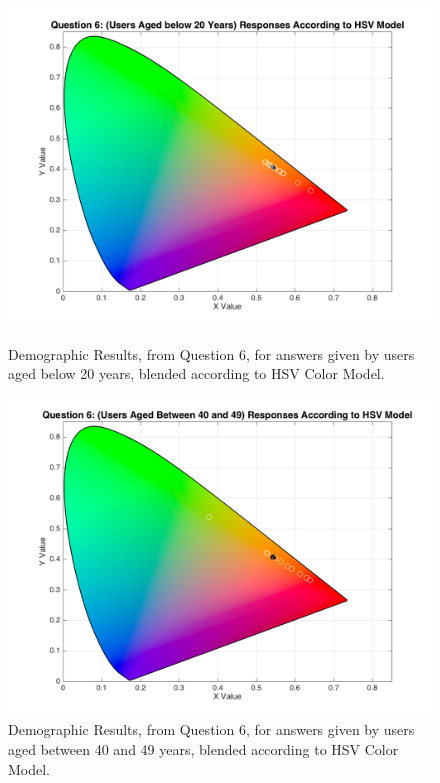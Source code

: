 \begin{figure}[!htbp]
  \centering
  \begin{minipage}{0.48\textwidth}
    \centering
    \includegraphics[width=\textwidth]{images/results/6_demo_age20_HSVresponses.png}
    \caption[Demographic Results, from Question 6, for answers given by users aged below 20 years, blended according to HSV Color Model.]{Demographic Results, from Question 6, for answers given by users aged below 20 years, blended according to HSV Color Model.}
    \label{fig:age_1}
  \end{minipage}\hfill
  \begin{minipage}{0.48\textwidth}
    \centering
    \includegraphics[width=\textwidth]{images/results/6_demo_age40_49_HSVresponses.png}
    \caption[Demographic Results, from Question 6, for answers given by users aged between 40 and 49 years, blended according to HSV Color Model.]{Demographic Results, from Question 6, for answers given by users aged between 40 and 49 years, blended according to HSV Color Model.}
    \label{fig:age_2}
  \end{minipage}
\end{figure}
%
